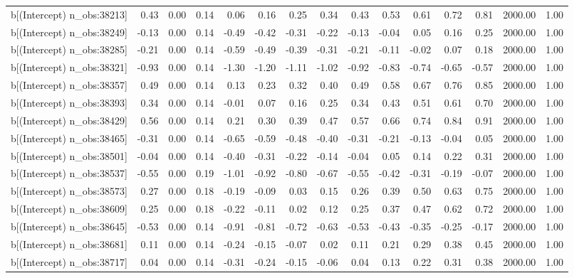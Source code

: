 \begin{table}[ht]
\begin{tabular}{rrrrrrrrrrrrrrr}
  b[(Intercept) n\_obs:38213] & 0.43 & 0.00 & 0.14 & 0.06 & 0.16 & 0.25 & 0.34 & 0.43 & 0.53 & 0.61 & 0.72 & 0.81 & 2000.00 & 1.00 \\ 
  b[(Intercept) n\_obs:38249] & -0.13 & 0.00 & 0.14 & -0.49 & -0.42 & -0.31 & -0.22 & -0.13 & -0.04 & 0.05 & 0.16 & 0.25 & 2000.00 & 1.00 \\ 
  b[(Intercept) n\_obs:38285] & -0.21 & 0.00 & 0.14 & -0.59 & -0.49 & -0.39 & -0.31 & -0.21 & -0.11 & -0.02 & 0.07 & 0.18 & 2000.00 & 1.00 \\ 
  b[(Intercept) n\_obs:38321] & -0.93 & 0.00 & 0.14 & -1.30 & -1.20 & -1.11 & -1.02 & -0.92 & -0.83 & -0.74 & -0.65 & -0.57 & 2000.00 & 1.00 \\ 
  b[(Intercept) n\_obs:38357] & 0.49 & 0.00 & 0.14 & 0.13 & 0.23 & 0.32 & 0.40 & 0.49 & 0.58 & 0.67 & 0.76 & 0.85 & 2000.00 & 1.00 \\ 
  b[(Intercept) n\_obs:38393] & 0.34 & 0.00 & 0.14 & -0.01 & 0.07 & 0.16 & 0.25 & 0.34 & 0.43 & 0.51 & 0.61 & 0.70 & 2000.00 & 1.00 \\ 
  b[(Intercept) n\_obs:38429] & 0.56 & 0.00 & 0.14 & 0.21 & 0.30 & 0.39 & 0.47 & 0.57 & 0.66 & 0.74 & 0.84 & 0.91 & 2000.00 & 1.00 \\ 
  b[(Intercept) n\_obs:38465] & -0.31 & 0.00 & 0.14 & -0.65 & -0.59 & -0.48 & -0.40 & -0.31 & -0.21 & -0.13 & -0.04 & 0.05 & 2000.00 & 1.00 \\ 
  b[(Intercept) n\_obs:38501] & -0.04 & 0.00 & 0.14 & -0.40 & -0.31 & -0.22 & -0.14 & -0.04 & 0.05 & 0.14 & 0.22 & 0.31 & 2000.00 & 1.00 \\ 
  b[(Intercept) n\_obs:38537] & -0.55 & 0.00 & 0.19 & -1.01 & -0.92 & -0.80 & -0.67 & -0.55 & -0.42 & -0.31 & -0.19 & -0.07 & 2000.00 & 1.00 \\ 
  b[(Intercept) n\_obs:38573] & 0.27 & 0.00 & 0.18 & -0.19 & -0.09 & 0.03 & 0.15 & 0.26 & 0.39 & 0.50 & 0.63 & 0.75 & 2000.00 & 1.00 \\ 
  b[(Intercept) n\_obs:38609] & 0.25 & 0.00 & 0.18 & -0.22 & -0.11 & 0.02 & 0.12 & 0.25 & 0.37 & 0.47 & 0.62 & 0.72 & 2000.00 & 1.00 \\ 
  b[(Intercept) n\_obs:38645] & -0.53 & 0.00 & 0.14 & -0.91 & -0.81 & -0.72 & -0.63 & -0.53 & -0.43 & -0.35 & -0.25 & -0.17 & 2000.00 & 1.00 \\ 
  b[(Intercept) n\_obs:38681] & 0.11 & 0.00 & 0.14 & -0.24 & -0.15 & -0.07 & 0.02 & 0.11 & 0.21 & 0.29 & 0.38 & 0.45 & 2000.00 & 1.00 \\ 
  b[(Intercept) n\_obs:38717] & 0.04 & 0.00 & 0.14 & -0.31 & -0.24 & -0.15 & -0.06 & 0.04 & 0.13 & 0.22 & 0.31 & 0.38 & 2000.00 & 1.00 \\ 

\end{tabular}
\end{table}
